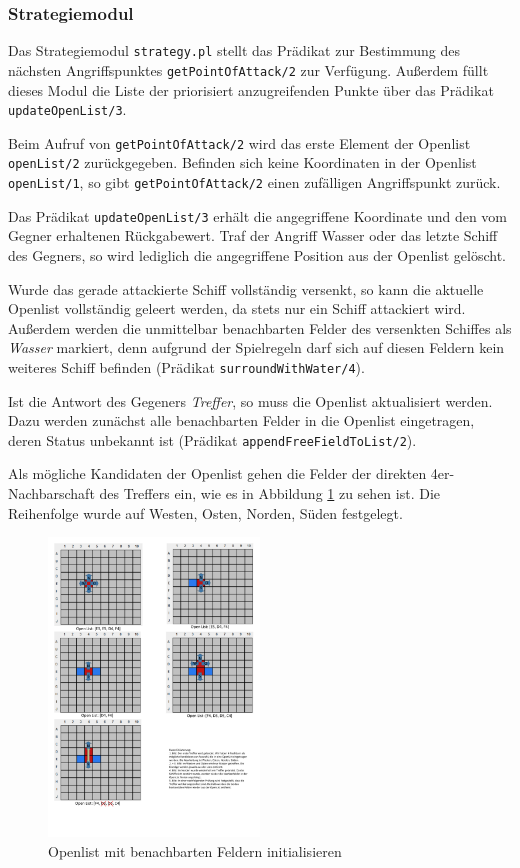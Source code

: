 \subsubsection{Strategiemodul} \label{sec:strategy}

Das Strategiemodul \texttt{strategy.pl} stellt das Prädikat zur Bestimmung des nächsten Angriffspunktes \texttt{getPointOfAttack/2}	zur Verfügung. 
Außerdem füllt dieses Modul die Liste der priorisiert anzugreifenden Punkte über das Prädikat \texttt{updateOpenList/3}. 

Beim Aufruf von \texttt{getPointOfAttack/2} wird das erste Element der Openlist \texttt{openList/2} zurückgegeben.
Befinden sich keine Koordinaten in der Openlist \texttt{openList/1}, so gibt \texttt{getPointOfAttack/2} einen zufälligen Angriffspunkt zurück.

Das Prädikat \texttt{updateOpenList/3} erhält die angegriffene Koordinate und den vom Gegner erhaltenen Rückgabewert. 
Traf der Angriff Wasser oder das letzte Schiff des Gegners, so wird lediglich die angegriffene Position aus der Openlist gelöscht.

Wurde das gerade attackierte Schiff vollständig versenkt, so kann die aktuelle Openlist vollständig geleert werden, da stets nur ein Schiff attackiert wird. 
Außerdem werden die unmittelbar benachbarten Felder des versenkten Schiffes als \textit{Wasser} markiert, denn aufgrund der Spielregeln darf sich auf diesen Feldern kein weiteres Schiff befinden (Prädikat \texttt{surroundWithWater/4}). 

Ist die Antwort des Gegeners \textit{Treffer}, so muss die Openlist aktualisiert werden. 
Dazu werden zunächst alle benachbarten Felder in die Openlist eingetragen, deren Status unbekannt ist (Prädikat \texttt{appendFreeFieldToList/2}). 

Als mögliche Kandidaten der Openlist gehen die Felder der direkten 4er-Nachbarschaft des Treffers ein, wie es in Abbildung \ref{fig:ErstelleOpenlist} zu sehen ist.
Die Reihenfolge wurde auf Westen, Osten, Norden, Süden festgelegt.
\begin{figure}[H]
  \centering
  \includegraphics[trim=5mm 204mm 105mm 4mm,clip,width=0.5\textwidth]{images/Strategie_1_FirstHit.pdf}
  \caption{Openlist mit benachbarten Feldern initialisieren}
  \label{fig:ErstelleOpenlist}
\end{figure}

